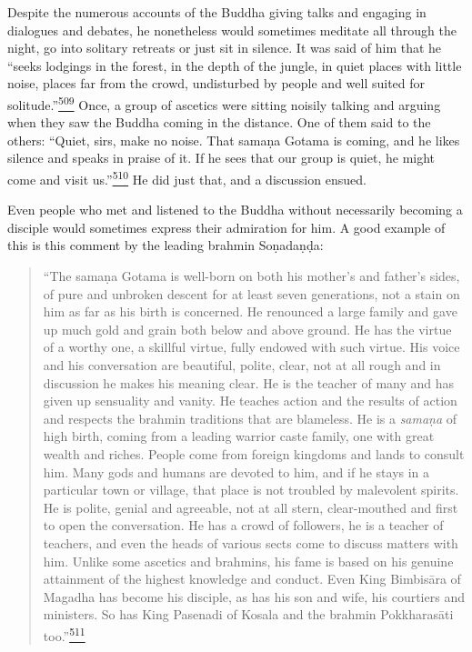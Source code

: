 Despite the numerous accounts of the Buddha giving talks and engaging in
dialogues and debates, he nonetheless would sometimes meditate all
through the night, go into solitary retreats or just sit in silence. It
was said of him that he ``seeks lodgings in the forest, in the depth of
the jungle, in quiet places with little noise, places far from the
crowd, undisturbed by people and well suited for
solitude.''\label{footprints_split_013.html_fnref509}\hyperref[footprints_split_025.htmlux5cux23fn509]{\textsuperscript{509}}
Once, a group of ascetics were sitting noisily talking and arguing when
they saw the Buddha coming in the distance. One of them said to the
others: ``Quiet, sirs, make no noise. That samaṇa Gotama is coming, and
he likes silence and speaks in praise of it. If he sees that our group
is quiet, he might come and visit
us.''\label{footprints_split_013.html_fnref510}\hyperref[footprints_split_025.htmlux5cux23fn510]{\textsuperscript{510}}
He did just that, and a discussion ensued.

Even people who met and listened to the Buddha without necessarily
becoming a disciple would sometimes express their admiration for him. A
good example of this is this comment by the leading brahmin Soṇadaṇḍa:

\begin{quote}
``The samaṇa Gotama is well-born on both his mother's and father's
sides, of pure and unbroken descent for at least seven generations, not
a stain on him as far as his birth is concerned. He renounced a large
family and gave up much gold and grain both below and above ground. He
has the virtue of a worthy one, a skillful virtue, fully endowed with
such virtue. His voice and his conversation are beautiful, polite,
clear, not at all rough and in discussion he makes his meaning clear. He
is the teacher of many and has given up sensuality and vanity. He
teaches action and the results of action and respects the brahmin
traditions that are blameless. He is a \emph{samaṇa} of high birth,
coming from a leading warrior caste family, one with great wealth and
riches. People come from foreign kingdoms and lands to consult him. Many
gods and humans are devoted to him, and if he stays in a particular town
or village, that place is not troubled by malevolent spirits. He is
polite, genial and agreeable, not at all stern, clear-mouthed and first
to open the conversation. He has a crowd of followers, he is a teacher
of teachers, and even the heads of various sects come to discuss matters
with him. Unlike some ascetics and brahmins, his fame is based on his
genuine attainment of the highest knowledge and conduct. Even King
Bimbisāra of Magadha has become his disciple, as has his son and wife,
his courtiers and ministers. So has King Pasenadi of Kosala and the
brahmin Pokkharasāti
too.''\label{footprints_split_013.html_fnref511}\hyperref[footprints_split_025.htmlux5cux23fn511]{\textsuperscript{511}}
\end{quote}

